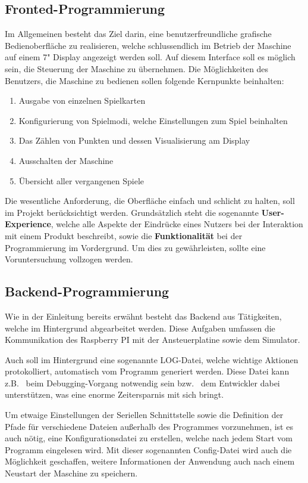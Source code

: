 \subsection{Fronted-Programmierung}\label{subsec:fronted-programmierung}
Im Allgemeinen besteht das Ziel darin, eine benutzerfreundliche grafische Bedienoberfläche zu realisieren, welche schlussendlich im Betrieb der Maschine auf einem 7" Display angezeigt werden soll.
Auf diesem Interface soll es möglich sein, die Steuerung der Maschine zu übernehmen.
Die Möglichkeiten des Benutzers, die Maschine zu bedienen sollen folgende Kernpunkte beinhalten:
\begin{enumerate}
    \item Ausgabe von einzelnen Spielkarten
    \item Konfigurierung von Spielmodi, welche Einstellungen zum Spiel beinhalten
    \item Das Zählen von Punkten und dessen Visualisierung am Display
    \item Ausschalten der Maschine
    \item Übersicht aller vergangenen Spiele
\end{enumerate}
Die wesentliche Anforderung, die Oberfläche einfach und schlicht zu halten, soll im Projekt berücksichtigt werden.
Grundsätzlich steht die sogenannte \textbf{User-Experience}, welche alle Aspekte der Eindrücke eines Nutzers bei der Interaktion mit einem Produkt beschreibt, sowie die \textbf{Funktionalität} bei der Programmierung im Vordergrund.
Um dies zu gewährleisten, sollte eine Voruntersuchung vollzogen werden.

\subsection{Backend-Programmierung}\label{subsec:backend-programmierung}
Wie in der Einleitung bereits erwähnt besteht das Backend aus Tätigkeiten, welche im Hintergrund abgearbeitet werden.
Diese Aufgaben umfassen die Kommunikation des Raspberry PI mit der Ansteuerplatine sowie dem Simulator.

Auch soll im Hintergrund eine sogenannte LOG-Datei, welche wichtige Aktionen protokolliert, automatisch vom Programm generiert werden.
Diese Datei kann z.B. \ beim Debugging-Vorgang notwendig sein bzw. \ dem Entwickler dabei unterstützen, was eine enorme Zeitersparnis mit sich bringt.

Um etwaige Einstellungen der Seriellen Schnittstelle sowie die Definition der Pfade für verschiedene Dateien außerhalb des Programmes vorzunehmen, ist es auch nötig, eine Konfigurationsdatei zu erstellen, welche nach jedem Start vom Programm eingelesen wird.
Mit dieser sogenannten Config-Datei wird auch die Möglichkeit geschaffen, weitere Informationen der Anwendung auch nach einem Neustart der Maschine zu speichern.

